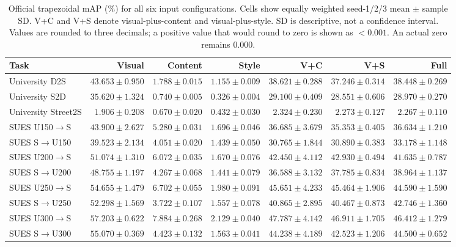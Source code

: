 \begin{table}[!t]
\centering
\caption{Official trapezoidal mAP (\%) for all six input configurations. Cells show equally weighted seed-1/2/3 mean $\pm$ sample SD. V+C and V+S denote visual-plus-content and visual-plus-style. SD is descriptive, not a confidence interval. Values are rounded to three decimals; a positive value that would round to zero is shown as $<0.001$. An actual zero remains 0.000.}
\label{tab:semantic-map}
\footnotesize
\setlength{\tabcolsep}{3pt}
\begin{tabular}{lrrrrrr}
\toprule
Task & Visual & Content & Style & V+C & V+S & Full \\
\midrule
University D2S & $43.653\pm0.950$ & $1.788\pm0.015$ & $1.155\pm0.009$ & $38.621\pm0.288$ & $37.246\pm0.314$ & $38.448\pm0.269$ \\
University S2D & $35.620\pm1.324$ & $0.740\pm0.005$ & $0.326\pm0.004$ & $29.100\pm0.409$ & $28.551\pm0.606$ & $28.970\pm0.270$ \\
University Street2S & $1.906\pm0.208$ & $0.670\pm0.020$ & $0.432\pm0.030$ & $2.324\pm0.230$ & $2.273\pm0.127$ & $2.267\pm0.110$ \\
\midrule
SUES U150$\to$S & $43.900\pm2.627$ & $5.280\pm0.031$ & $1.696\pm0.046$ & $36.685\pm3.679$ & $35.353\pm0.405$ & $36.634\pm1.210$ \\
SUES S$\to$U150 & $39.523\pm2.134$ & $4.051\pm0.020$ & $1.439\pm0.050$ & $30.765\pm1.844$ & $30.890\pm0.383$ & $33.178\pm1.148$ \\
SUES U200$\to$S & $51.074\pm1.310$ & $6.072\pm0.035$ & $1.670\pm0.076$ & $42.450\pm4.112$ & $42.930\pm0.494$ & $41.635\pm0.787$ \\
SUES S$\to$U200 & $48.755\pm1.197$ & $4.267\pm0.068$ & $1.441\pm0.079$ & $36.588\pm3.132$ & $37.785\pm0.834$ & $38.964\pm1.137$ \\
SUES U250$\to$S & $54.655\pm1.479$ & $6.702\pm0.055$ & $1.980\pm0.091$ & $45.651\pm4.233$ & $45.464\pm1.906$ & $44.590\pm1.590$ \\
SUES S$\to$U250 & $52.298\pm1.569$ & $3.722\pm0.107$ & $1.557\pm0.078$ & $40.865\pm2.895$ & $40.467\pm0.873$ & $42.746\pm1.360$ \\
SUES U300$\to$S & $57.203\pm0.622$ & $7.884\pm0.268$ & $2.129\pm0.040$ & $47.787\pm4.142$ & $46.911\pm1.705$ & $46.412\pm1.279$ \\
SUES S$\to$U300 & $55.070\pm0.369$ & $4.423\pm0.132$ & $1.563\pm0.041$ & $44.238\pm4.189$ & $42.523\pm1.206$ & $44.500\pm0.652$ \\
\bottomrule
\end{tabular}
\end{table}
